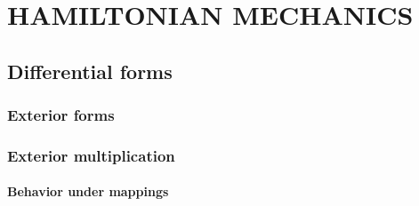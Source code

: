 \documentclass[leqno]{book}
\numberwithin{equation}{section}
\theoremstyle{plain}
\theoremstyle{definition}
\theoremstyle{remark}
\theoremstyle{smallcap}
\numberwithin{prob}{section}
\begin{document}
%
%
%
%
%
%

\part{HAMILTONIAN MECHANICS}

\chapter{Differential forms}

\section{Exterior forms}

\section{Exterior multiplication}



\setcounter{subsection}{2}
\subsection{\label{sec:exterior_mapping}Behavior under mappings}
\end{document}
